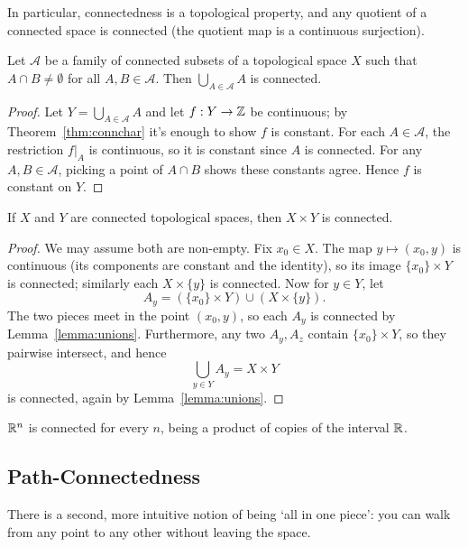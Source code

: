 \documentclass[a4paper]{scrartcl}
\begin{document}
In particular, connectedness is a topological property, and any quotient of a connected space is connected (the quotient map is a continuous surjection).

\begin{lemma}\label{lemma:unions}
    Let $\mathcal{A}$ be a family of connected subsets of a topological space $X$ such that $A \cap B \neq \emptyset$ for all $A, B \in \mathcal{A}$. Then $\bigcup_{A \in \mathcal{A}} A$ is connected.
\end{lemma}
\begin{proof}
    Let $Y = \bigcup_{A \in \mathcal{A}} A$ and let $f: Y \rightarrow \mathbb{Z}$ be continuous; by Theorem~\ref{thm:connchar} it's enough to show $f$ is constant. For each $A \in \mathcal{A}$, the restriction $f|_A$ is continuous, so it is constant since $A$ is connected. For any $A, B \in \mathcal{A}$, picking a point of $A \cap B$ shows these constants agree. Hence $f$ is constant on $Y$.
\end{proof}

\begin{theorem}
    If $X$ and $Y$ are connected topological spaces, then $X \times Y$ is connected.
\end{theorem}
\begin{proof}
    We may assume both are non-empty. Fix $x_0 \in X$. The map $y \mapsto (x_0, y)$ is continuous (its components are constant and the identity), so its image $\{x_0\} \times Y$ is connected; similarly each $X \times \{y\}$ is connected. Now for $y \in Y$, let
    $$
    A_y = (\{x_0\} \times Y) \cup (X \times \{y\}).
    $$
    The two pieces meet in the point $(x_0, y)$, so each $A_y$ is connected by Lemma~\ref{lemma:unions}. Furthermore, any two $A_y, A_z$ contain $\{x_0\} \times Y$, so they pairwise intersect, and hence
    $$
    \bigcup_{y \in Y} A_y = X \times Y
    $$
    is connected, again by Lemma~\ref{lemma:unions}.
\end{proof}

\begin{example}
    $\mathbb{R}^n$ is connected for every $n$, being a product of copies of the interval $\mathbb{R}$.
\end{example}

\subsection{Path-Connectedness}

There is a second, more intuitive notion of being `all in one piece': you can walk from any point to any other without leaving the space.
\end{document}
